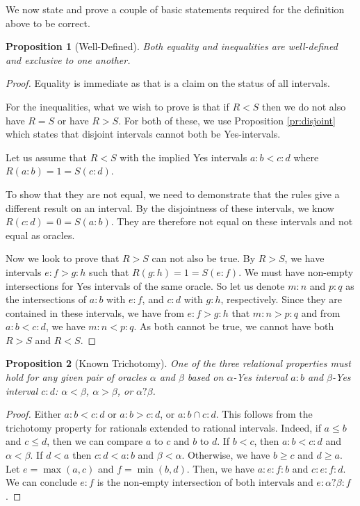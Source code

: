 \documentclass[12pt]{article}
\newtheorem{proposition}{Proposition}[subsection]
\theoremstyle{remark}
\begin{document}
We now state and prove a couple of basic statements required for the definition above to be correct. 

\begin{proposition}[Well-Defined]\label{pr:wd}
Both equality and inequalities are well-defined and exclusive to one another.  
\end{proposition}

\begin{proof}
Equality is immediate as that is a claim on the status of all intervals. 

For the inequalities, what we wish to prove is that if $R < S$ then we do not also have $R=S$ or have $R > S$. For both of these, we use Proposition \ref{pr:disjoint} which states that disjoint intervals cannot both be Yes-intervals. 

Let us assume that $R<S$ with the implied Yes intervals $a:b < c:d$ where $R(a:b)=1 =S(c:d)$.

To show that they are not equal, we need to demonstrate that the rules give a different result on an interval. By the disjointness of these intervals, we know  $R(c:d) = 0 = S(a:b)$. They are therefore not equal on these intervals and not equal as oracles.  

Now we look to prove that $R>S$ can not also be true. By $R > S$, we have intervals $e:f > g:h$ such that $R(g:h) = 1 = S(e:f)$. We must have non-empty intersections for Yes intervals of the same oracle. So let us denote $m:n$ and $p:q$ as the intersections of $a:b$ with $e:f$, and $c:d$ with $g:h$, respectively. Since they are contained in these intervals, we have from $e:f > g:h$ that $m:n > p:q$ and from $a:b < c:d$, we have $m:n < p:q$. As both cannot be true, we cannot have both $R>S$ and $R<S$. 
\end{proof}

\begin{proposition}[Known Trichotomy]
One of the three relational properties must hold for any given pair of oracles $\alpha$ and $\beta$ based on $\alpha$-Yes interval $a:b$ and $\beta$-Yes interval $c:d$: $\alpha < \beta$,  $\alpha > \beta$, or $\alpha ? \beta$. 
\end{proposition}

\begin{proof}
     Either $a:b < c:d$ or $a:b > c:d$, or $a:b \cap c:d$. This follows from the trichotomy property for rationals extended to rational intervals. Indeed, if $a \leq b$ and $c \leq d$, then we can compare $a$ to $c$ and $b$ to $d$. If $b < c$, then $a:b < c:d$ and $\alpha < \beta$. If $d < a$   then $c:d < a:b$ and $\beta < \alpha$. Otherwise, we have $b \geq c$ and $d \geq a$. Let $e= \max(a,c)$ and $f = \min(b,d)$. Then, we have $a:e:f:b$ and $c:e:f:d$. We can conclude $e:f$ is the non-empty intersection of both intervals and $e:\alpha ? \beta:f$. 
\end{proof}
\end{document}
